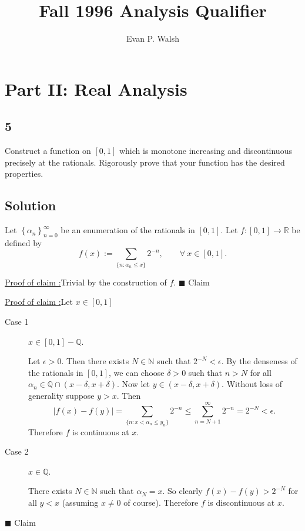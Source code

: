 \documentclass[12pt]{article}
\title{Fall 1996 Analysis Qualifier}
\author{Evan P. Walsh}
\newcounter{ProofCounter}
\newcounter{ClaimCounter}[ProofCounter]
\newenvironment{claim}[1]{\vspace{3mm}\stepcounter{ClaimCounter}\par\noindent\underline{\bf Claim \theClaimCounter:}\space#1}{}
\newenvironment{claimproof}[1]{\par\noindent\underline{Proof of claim \theClaimCounter:}\space#1}{\hfill $\blacksquare$ Claim \theClaimCounter}
\begin{document}

\section*{Part II: Real Analysis}

\subsection*{5}
Construct a function on $[0,1]$ which is monotone increasing and discontinuous precisely at the rationals. Rigorously prove that your function has the
desired properties.

\subsection*{Solution}
Let $\left\{ \alpha_{n} \right\}_{n=0}^{\infty}$ be an enumeration of the rationals in $[0,1]$. Let $f : [0,1] \rightarrow \mathbb{R}$ be defined by 
\[ f(x) := \sum_{\{n : \alpha_{n} \leq x \}}2^{-n}, \qquad \forall \ x \in [0,1]. \]
\begin{claimproof}
Trivial by the construction of $f$.
\end{claimproof}

\begin{claimproof}
Let $x \in [0,1]$
\begin{description}
\item[Case 1] $x \in [0,1] - \mathbb{Q}$.

Let $\epsilon > 0$. Then there exists $N \in \mathbb{N}$ such that $2^{-N} < \epsilon$. By the denseness of the rationals in $[0,1]$, we can choose
$\delta > 0$ such that $n > N$ for all $\alpha_{n} \in \mathbb{Q} \cap (x - \delta, x + \delta)$. Now let $y \in (x - \delta, x + \delta)$. Without
loss of generality suppose $y > x$. Then 
\[ |f(x) - f(y)| = \sum_{\{n : x < \alpha_{n} \leq y_{n}\}} 2^{-n} \leq \sum_{n=N+1}^{\infty}2^{-n} = 2^{-N} < \epsilon. \]
Therefore $f$ is continuous at $x$.

\item[Case 2] $x \in \mathbb{Q}$.

There exists $N \in \mathbb{N}$ such that $\alpha_{N} = x$. So clearly $f(x) - f(y) > 2^{-N}$ for all $y < x$ (assuming $x \neq 0$ of course).
Therefore $f$ is discontinuous at $x$.
\end{description}
\end{claimproof}
\end{document}
